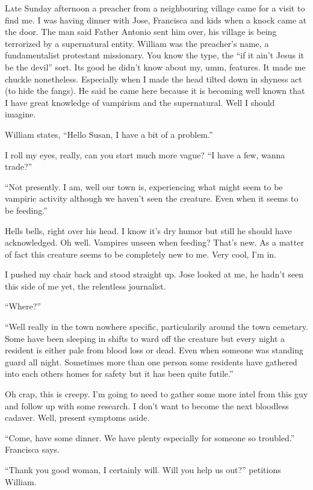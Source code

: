 \lettrine[lines=2,lraise=0]{L}ate Sunday afternoon a preacher from a neighbouring village came for a visit to find me. I was having dinner with Jose, Francisca and kids when a knock came at the door. The man said Father Antonio sent him over, his village is being terrorized by a supernatural entity. William was the preacher's name, a fundamentalist protestant missionary. You know the type, the ``if it ain't Jesus it be the devil'' sort. Its good he didn't know about my, umm, features. It made me chuckle nonetheless. Especially when I made the head tilted down in shyness act (to hide the fangs). He said he came here because it is becoming well known that I have great knowledge of vampirism and the supernatural. Well I should imagine.

William states, ``Hello Susan, I have a bit of a problem.''

I roll my eyes, really, can you start much more vague? ``I have a few, wanna trade?''

``Not presently. I am, well our town is, experiencing what might seem to be vampiric activity although we haven't seen the creature. Even when it seems to be feeding.''

Hells bells, right over his head. I know it's dry humor but still he should have acknowledged. Oh well. Vampires unseen when feeding? That's new. As a matter of fact this creature seems to be completely new to me. Very cool, I'm in.

I pushed my chair back and stood straight up. Jose looked at me, he hadn't seen this side of me yet, the relentless journalist.

``Where?''

``Well really in the town nowhere specific, particularily around the town cemetary. Some have been sleeping in shifts to ward off the creature but every night a resident is either pale from blood loss or dead. Even when someone was standing guard all night. Sometimes more than one person some residents have gathered into each others homes for safety but it has been quite futile.''

Oh crap, this is creepy. I'm going to need to gather some more intel from this guy and follow up with some research. I don't want to become the next bloodless cadaver. Well, present symptoms aside.

``Come, have some dinner. We have plenty especially for someone so troubled.'' Francisca says.

``Thank you good woman, I certainly will. Will you help us out?'' petitions William.

